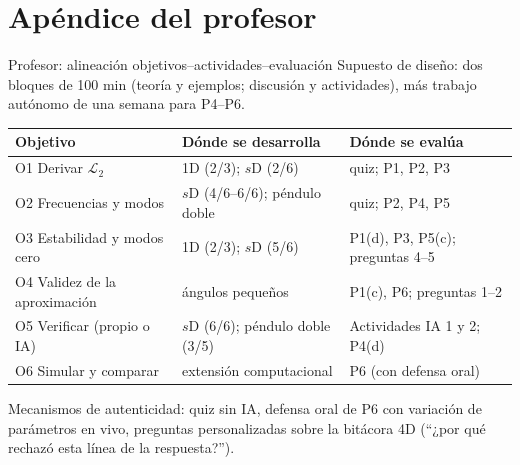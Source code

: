 \documentclass[spanish]{beamer}
\newif\ifinstructor
\begin{document}
\ifinstructor
\appendix
\section*{Apéndice del profesor}
\newcommand{\campo}[1]{\textcolor{darkred}{\textbf{#1}}}

\begin{frame}{Profesor: alineación objetivos--actividades--evaluación}
\scriptsize
Supuesto de diseño: dos bloques de 100 min (teoría y ejemplos; discusión y actividades), más trabajo autónomo de una semana para P4--P6.

\medskip
\begin{tabular}{@{}p{}p{}p{}@{}}
\toprule
\textbf{Objetivo} & \textbf{Dónde se desarrolla} & \textbf{Dónde se evalúa}\\
\midrule
O1 Derivar $\mathcal{L}_2$ & 1D (2/3); $s$D (2/6) & quiz; P1, P2, P3 \\
O2 Frecuencias y modos & $s$D (4/6--6/6); péndulo doble & quiz; P2, P4, P5 \\
O3 Estabilidad y modos cero & 1D (2/3); $s$D (5/6) & P1(d), P3, P5(c); preguntas 4--5 \\
O4 Validez de la aproximación & ángulos pequeños & P1(c), P6; preguntas 1--2 \\
O5 Verificar (propio o IA) & $s$D (6/6); péndulo doble (3/5) & Actividades IA 1 y 2; P4(d) \\
O6 Simular y comparar & extensión computacional & P6 (con defensa oral) \\
\bottomrule
\end{tabular}

\medskip
Mecanismos de autenticidad: quiz sin IA, defensa oral de P6 con variación de parámetros en vivo, preguntas personalizadas sobre la bitácora 4D (``¿por qué rechazó esta línea de la respuesta?'').
\end{frame}
\end{document}
